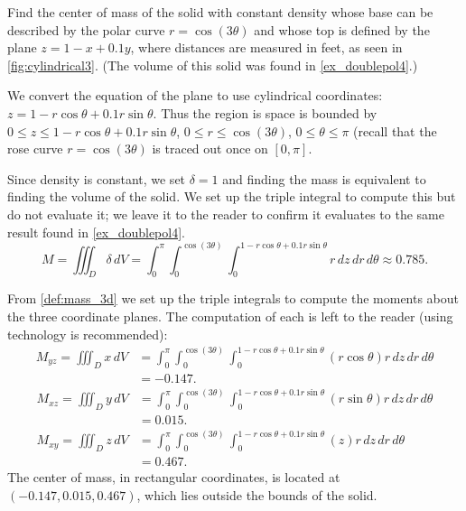 {Find the center of mass of the solid with constant density whose base can be described by the polar curve $r=\cos(3\theta)$ and whose top is defined by the plane $z=1-x+0.1y$, where distances are measured in feet, as seen in \autoref{fig:cylindrical3}. (The volume of this solid was found in \autoref{ex_doublepol4}.)}
{We convert the equation of the plane to use cylindrical coordinates: $z= 1-r\cos\theta+0.1r\sin\theta$. Thus the region is space is bounded by $0 \leq z \leq 1-r\cos\theta + 0.1r\sin\theta$, $0 \leq r \leq \cos(3\theta)$, $0 \leq \theta \leq \pi$ (recall that the rose curve $r=\cos(3\theta)$ is traced out once on $[0,\pi]$.
%

Since density is constant, we set $\delta = 1$ and finding the mass is equivalent to finding the volume of the solid. We set up the triple integral to compute this but do not evaluate it; we leave it to the reader to confirm it evaluates to the same result found in \autoref{ex_doublepol4}.
\[
M = \iiint_D\delta \, dV = \int_0^{\pi}\int_0^{\cos(3\theta)}\int_0^{1-r\cos\theta+0.1r\sin\theta} r\,dz\,dr\,d\theta \approx 0.785.
\]

From \autoref{def:mass_3d} we set up the triple integrals to compute the moments about the three coordinate planes. The computation of each is left to the reader (using technology is recommended):
\begin{align*}
M_{yz} = \iiint_D x\,dV &= \int_0^{\pi}\int_0^{\cos(3\theta)}\int_0^{1-r\cos\theta+0.1r\sin\theta} (r\cos\theta) r\,dz\,dr\,d\theta\\
&= -0.147.
\end{align*}
\begin{align*}
M_{xz} = \iiint_D y\,dV &= \int_0^{\pi}\int_0^{\cos(3\theta)}\int_0^{1-r\cos\theta+0.1r\sin\theta} (r\sin\theta) r\,dz\,dr\,d\theta\\
&= 0.015.\\
M_{xy} = \iiint_D z\,dV &= \int_0^{\pi}\int_0^{\cos(3\theta)}\int_0^{1-r\cos\theta+0.1r\sin\theta} (z) r\,dz\,dr\,d\theta\\
 &= 0.467.
\end{align*}
The center of mass, in rectangular coordinates,  is located at $(-0.147,0.015,0.467)$, which lies outside the bounds of the solid.}

